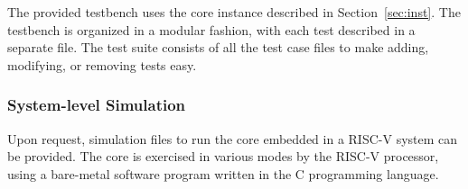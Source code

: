 %

The provided testbench uses the core instance described in
Section~\ref{sec:inst}. The testbench is organized in a modular fashion,
with each test described in a separate file. The test suite consists of
all the test case files to make adding, modifying, or removing tests easy.



\subsubsection*{System-level Simulation}

Upon request, simulation files to run the core embedded in a RISC-V system can
be provided. The core is exercised in various modes by the RISC-V processor,
using a bare-metal software program written in the C programming language.
